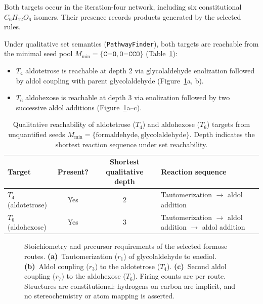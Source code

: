\documentclass[pdflatex,referee]{../template/sn-jnl}
\theoremstyle{plain}%
\theoremstyle{definition}%
\theoremstyle{remark}%
\newcommand{\tabref}[1]{Table~\ref{#1}}
\begin{document}
Both targets occur in the iteration-four network, including six constitutional $C_6H_{12}O_6$ isomers. Their presence records products generated by the selected rules.

Under qualitative set semantics (\texttt{PathwayFinder}), both targets are reachable from the minimal seed pool $M_{\min} = \{\texttt{C=O}, \texttt{O=CCO}\}$ (\tabref{tab:formose_qualitative_repeat4}):
\begin{itemize}
    \item $T_4$ aldotetrose is reachable at depth 2 via glycolaldehyde enolization followed by aldol coupling with parent glycolaldehyde (Figure~\ref{fig:formose_reaction_motifs}a, b).
    \item $T_6$ aldohexose is reachable at depth 3 via enolization followed by two successive aldol additions (Figure~\ref{fig:formose_reaction_motifs}a--c).
\end{itemize}

\begin{table}[htbp]
\centering
\caption{Qualitative reachability of aldotetrose ($T_4$) and aldohexose ($T_6$) targets from unquantified seeds $M_{\min} = \{\text{formaldehyde}, \text{glycolaldehyde}\}$. Depth indicates the shortest reaction sequence under set reachability.}
\label{tab:formose_qualitative_repeat4}
\begin{tabularx}{\linewidth}{@{}lcc>{\raggedright\arraybackslash}X@{}}
\toprule
\textbf{Target} & \textbf{Present?} & \textbf{Shortest qualitative depth} & \textbf{Reaction sequence} \\
\midrule
$T_4$ (aldotetrose) & Yes & 2 & Tautomerization $\to$ aldol addition \\
$T_6$ (aldohexose)  & Yes & 3 & Tautomerization $\to$ aldol addition $\to$ aldol addition \\
\bottomrule
\end{tabularx}
\end{table}

\begin{figure}[!htbp]
\centering
\caption{Stoichiometry and precursor requirements of the selected formose routes. \textbf{(a)}~Tautomerization ($r_1$) of glycolaldehyde to enediol. \textbf{(b)}~Aldol coupling ($r_3$) to the aldotetrose ($T_4$). \textbf{(c)}~Second aldol coupling ($r_7$) to the aldohexose ($T_6$). Firing counts are per route. Structures are constitutional: hydrogens on carbon are implicit, and no stereochemistry or atom mapping is asserted.}
\label{fig:formose_reaction_motifs}
\end{figure}
\end{document}
